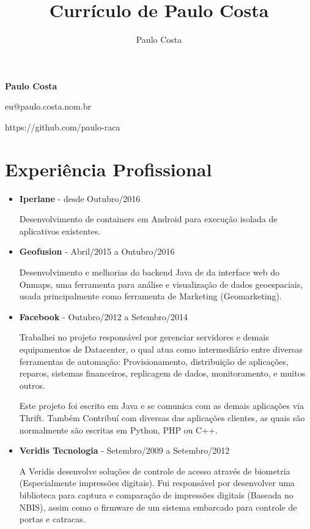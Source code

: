 \documentclass[a4paper,10pt]{article}
\title{Currículo de Paulo Costa}
\author{Paulo Costa}
\begin{document}
  
  \LARGE\textbf{Paulo Costa}

  \large eu@paulo.costa.nom.br

  \large https://github.com/paulo-raca
  


  \normalsize 

  \section{Experiência Profissional}
    \begin{itemize}
      \item
        \textbf{Iperlane} - desde Outubro/2016

        Desenvolvimento de containers em Android para execução isolada de aplicativos existentes.

      \item
        \textbf{Geofusion} - Abril/2015 a Outubro/2016

        Desenvolvimento e melhorias do backend Java de da interface web do Onmaps, uma ferramenta para análise e visualização de dados geoespaciais, usada principalmente como ferramenta de Marketing (Geomarketing).

      \item
        \textbf{Facebook} - Outubro/2012 a Setembro/2014
        
        Trabalhei no projeto responsável por gerenciar servidores e demais equipamentos de Datacenter, o qual atua como intermediário entre diversas ferramentas de automação: Provisionamento, distribuição de aplicações, reparos, sistemas financeiros, replicagem de dados, monitoramento, e muitos outros.
        
        Este projeto foi escrito em Java e se comunica com as demais aplicações via Thrift. Também Contribuí com diversas das aplicações clientes, as quais são normalmente são escritas em Python, PHP ou C++.

      \item
        \textbf{Veridis Tecnologia} - Setembro/2009 a Setembro/2012

        A Veridis desenvolve soluções de controle de acesso através de biometria (Especialmente impressões digitais). Fui responsável por desenvolver uma biblioteca para captura e comparação de impressões digitais (Baseada no NBIS), assim como o firmware de um sistema embarcado para controle de portas e catracas.
        

\end{itemize}
\end{document}
